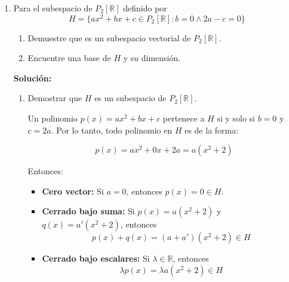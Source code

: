 \documentclass[a4paper]{article}
\begin{document}
\begin{enumerate}
\textbf{Solución:}



\textbf{1. Contiene al vector cero:}

\[
A \cdot 0 = \lambda \cdot 0 = 0 \quad \Rightarrow \quad 0 \in S
\]

\textbf{2. Cerrado bajo combinaciones lineales:}

Sean $u, v \in S$ y $a, b \in \mathbb{R}$. Como $Au = \lambda u$ y $Av = \lambda v$, entonces:

\[
A(au + bv) = aAu + bAv = a\lambda u + b\lambda v = \lambda(au + bv)
\Rightarrow au + bv \in S
\]

\bigskip

\textbf{Conclusión:} El conjunto $S$ cumple las condiciones de subespacio vectorial. Por lo tanto,

\[
\boxed{S \text{ es un subespacio de } \mathbb{R}^n}
\]



\item Para el subespacio de $P_2[\mathbb{R}]$ definido por
\[H=\{ax^2+bx+c\in P_2[\mathbb{R}]\colon b=0 \wedge 2a-c=0 \}\]

\begin{enumerate}
\item Demuestre que es un subespacio vectorial de $P_2[\mathbb{R}]$.
    \item Encuentre una base de $H$ y su dimensi\'on.
\end{enumerate}
\textbf{Solución:}
\begin{enumerate}
    \item Demostrar que $H$ es un subespacio de $P_2[\mathbb{R}]$.

Un polinomio $p(x) = ax^2 + bx + c$ pertenece a $H$ si y solo si $b = 0$ y $c = 2a$. Por lo tanto, todo polinomio en $H$ es de la forma:

\[
p(x) = ax^2 + 0x + 2a = a(x^2 + 2)
\]

Entonces:
\begin{itemize}
    \item \textbf{Cero vector:} Si $a = 0$, entonces $p(x) = 0 \in H$.
    \item \textbf{Cerrado bajo suma:} Si $p(x) = a(x^2 + 2)$ y $q(x) = a'(x^2 + 2)$, entonces
    \[
    p(x) + q(x) = (a + a')(x^2 + 2) \in H
    \]
    \item \textbf{Cerrado bajo escalares:} Si $\lambda \in \mathbb{R}$, entonces
    \[
    \lambda p(x) = \lambda a(x^2 + 2) \in H
    \]
\end{itemize}


\end{enumerate}
\end{enumerate}
\end{document}
